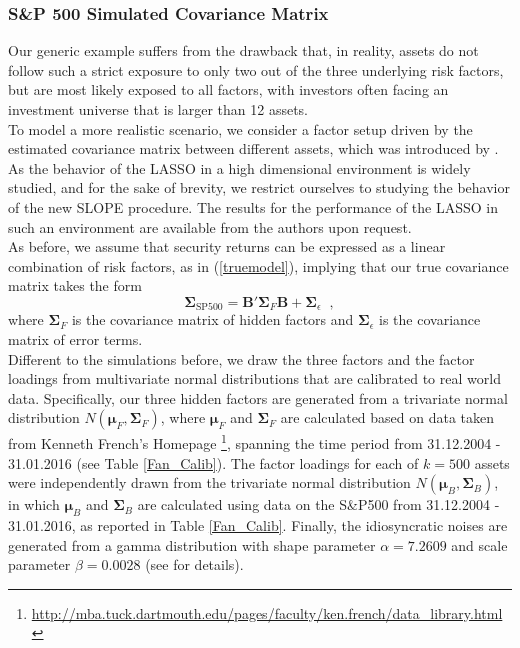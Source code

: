 \documentclass[12pt, a4paper]{article}
\newcommand{\bfmu}{\boldsymbol{\mu} }
\newcommand{\bfSigma}{\boldsymbol{\Sigma} }
\begin{document}
\subsubsection*{S\&P 500 Simulated Covariance Matrix}
Our generic example suffers from the drawback that, in reality, assets do not follow such a strict exposure to only two out of the three underlying risk factors, but are most likely exposed to all factors, with investors often facing an investment universe that is larger than 12 assets.\\
To model a more realistic scenario, we consider a factor setup driven by the estimated covariance matrix between different assets, which was introduced by \citet{Fan2008}. As the behavior of the LASSO in a high dimensional environment is widely studied, and for the sake of brevity, we restrict ourselves to studying the behavior of the new SLOPE procedure. The results for the performance of the LASSO in such an environment are available from the authors upon request.\\
As before, we assume that security returns can be expressed as a linear combination of risk factors, as in (\ref{truemodel}), implying that our true covariance matrix takes the form
$$\bfSigma_{\text{SP500}}=\boldsymbol{B}'\bfSigma_F\boldsymbol{B}+\bfSigma_{\epsilon}\;\;,$$
where $\bfSigma_{F}$ is the covariance matrix of hidden factors and $\bfSigma_{\epsilon}$ is the covariance matrix of error terms.\\
Different to the simulations before, we draw the three factors and the factor loadings from  multivariate normal distributions that are calibrated to real world data. Specifically, our three hidden factors are generated from a trivariate normal distribution $N(\bfmu_{F}, \bfSigma_{F})$, where $\bfmu_{F}$ and $\bfSigma_{F}$ are calculated based on data taken from Kenneth French's Homepage \footnote{\url{http://mba.tuck.dartmouth.edu/pages/faculty/ken.french/data_library.html}}, spanning the time period from 31.12.2004 - 31.01.2016 (see Table \ref{Fan_Calib}). The factor loadings for each of $k=500$ assets were independently drawn from the trivariate normal distribution $N(\bfmu_{B}, \bfSigma_{B})$, in which $\bfmu_{B}$ and $\bfSigma_{B}$ are calculated using data on the S\&P500 from 31.12.2004 - 31.01.2016, as reported in Table \ref{Fan_Calib}. Finally, the idiosyncratic noises are generated from a gamma distribution with shape parameter $\alpha = 7.2609$ and scale parameter $\beta = 0.0028$ (see \citet{Fan2008} for details).
%
\end{document}
